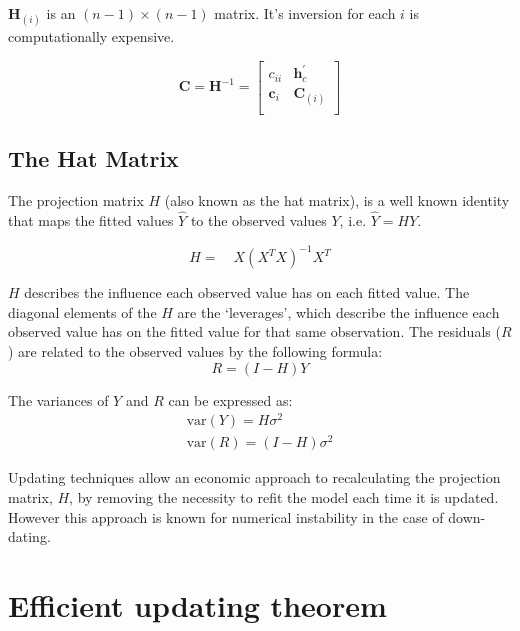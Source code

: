 \documentclass[12pt, a4paper]{report}
\theoremstyle{plain}
\theoremstyle{definition}
\theoremstyle{remark}
\begin{document}
	$\boldsymbol{H}_{(i)}$ is an $(n-1) \times (n-1)$ matrix. It's inversion for each $i$ is computationally expensive.
	
	\begin{equation*}
	\boldsymbol{C} = \boldsymbol{H}^{-1} =\left[%
	\begin{array}{cc}
	c_{ii} & \boldsymbol{h}^{\prime}_{c}\\
	\boldsymbol{c}_{i} & \boldsymbol{C}_{(i)}\\
	\end{array}%
	\right]
	\end{equation*}
	
	\subsection{The Hat Matrix} %
	
	The projection matrix $H$ (also known as the hat matrix), is a
	well known identity that maps the fitted values $\hat{Y}$ to the
	observed values $Y$, i.e. $\hat{Y} = HY$.
	
	\begin{equation}
	H =\quad X(X^{T}X)^{-1}X^{T}
	\end{equation}
	
	$H$ describes the influence each observed value has on each fitted
	value. The diagonal elements of the $H$ are the `leverages', which
	describe the influence each observed value has on the fitted value
	for that same observation. The residuals ($R$) are related to the
	observed values by the following formula:
	\begin{equation}
	R = (I-H)Y
	\end{equation}
	
	The variances of $Y$ and $R$ can be expressed as:
	\begin{eqnarray}
	\mbox{var}(Y) = H\sigma^{2} \nonumber\\
	\mbox{var}(R) = (I-H)\sigma^{2}
	\end{eqnarray}
	
	Updating techniques allow an economic approach to recalculating
	the projection matrix, $H$, by removing the necessity to refit the
	model each time it is updated. However this approach is known for
	numerical instability in the case of down-dating.
	
	\section{Efficient updating theorem}
	
\end{document}
